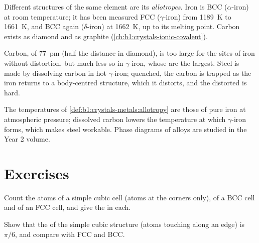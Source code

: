 \begin{definition}[Allotropy]\label{def:b1:crystals-metals:allotropy}
Different  structures of the same element are its
\emph{allotropes}. Iron is BCC ($\alpha$-iron) at room
temperature; it has been measured FCC ($\gamma$-iron) from \qty{1189}{K}
to \qty{1661}{K}, and BCC again ($\delta$-iron) at \qty{1662}{K}, up to
its melting point. Carbon exists as diamond and as graphite
(\cref{ch:b1:crystals-ionic-covalent}).
\end{definition}

\begin{example}[Steel]\label{ex:b1:crystals-metals:steel}
Carbon, of  \qty{77}{pm} (half the  distance in
diamond), is too large for the sites of iron without distortion, but much
less so in $\gamma$-iron, whose  are the largest. Steel
is made by dissolving carbon in hot $\gamma$-iron; quenched, the carbon is
trapped as the iron returns to a body-centred structure, which it
distorts, and the distorted  is hard.
\end{example}

\begin{remark}\label{rem:b1:crystals-metals:iron-T}
The temperatures of \cref{def:b1:crystals-metals:allotropy} are those of
pure iron at atmospheric pressure; dissolved carbon lowers the
temperature at which $\gamma$-iron forms, which makes steel workable.
Phase diagrams of alloys are studied in the Year 2 volume.
\end{remark}

\section{Exercises}

\begin{exercise}[$\star$]\label{exo:b1:crystals-metals:1}
Count the atoms of a simple cubic cell (atoms at the corners only), of a
BCC cell and of an FCC cell, and give the  in each.
\end{exercise}

\begin{exercise}[$\star$]\label{exo:b1:crystals-metals:2}
Show that the  of the simple cubic structure (atoms touching
along an edge) is $\pi/6$, and compare with FCC and BCC.
\end{exercise}


